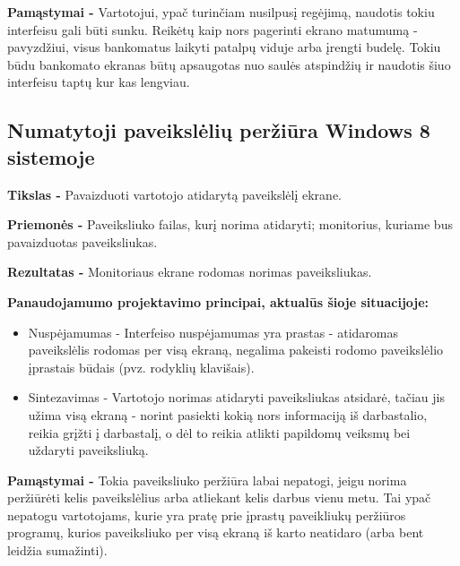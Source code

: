 ﻿\documentclass[a4paper, 12pt]{article}
\begin{document}
		\textbf{Pamąstymai -}
		Vartotojui, ypač turinčiam nusilpusį regėjimą, naudotis tokiu interfeisu gali būti sunku.
		Reikėtų kaip nors pagerinti ekrano matumumą - pavyzdžiui, visus bankomatus laikyti patalpų viduje arba įrengti budelę.
		Tokiu būdu bankomato ekranas būtų apsaugotas nuo saulės atspindžių ir naudotis šiuo interfeisu taptų kur kas lengviau.

		
	\subsection{Numatytoji paveikslėlių peržiūra Windows 8 sistemoje}
		\textbf{Tikslas -}
		Pavaizduoti vartotojo atidarytą paveikslėlį ekrane.
		
		\textbf{Priemonės -}
		Paveiksliuko failas, kurį norima atidaryti; monitorius, kuriame bus pavaizduotas paveiksliukas.

		\textbf{Rezultatas -}
		Monitoriaus ekrane rodomas norimas paveiksliukas.

		\textbf{Panaudojamumo projektavimo principai, aktualūs šioje situacijoje:}
		\begin{itemize}
		\item Nuspėjamumas - Interfeiso nuspėjamumas yra prastas - atidaromas paveikslėlis rodomas per visą ekraną, negalima pakeisti rodomo paveikslėlio įprastais būdais (pvz. rodyklių klavišais).
		\item Sintezavimas - Vartotojo norimas atidaryti paveiksliukas atsidarė, tačiau jis užima visą ekraną - norint pasiekti kokią nors informaciją iš darbastalio, reikia grįžti į darbastalį, o dėl to reikia atlikti papildomų veiksmų bei uždaryti paveiksliuką.
		\end{itemize}

		\textbf{Pamąstymai -}
		Tokia paveiksliuko peržiūra labai nepatogi, jeigu norima peržiūrėti kelis paveikslėlius arba atliekant kelis darbus vienu metu.
		Tai ypač nepatogu vartotojams, kurie yra pratę prie įprastų paveikliukų peržiūros programų, kurios paveiksliuko per visą ekraną iš karto neatidaro (arba bent leidžia sumažinti).
\end{document}
